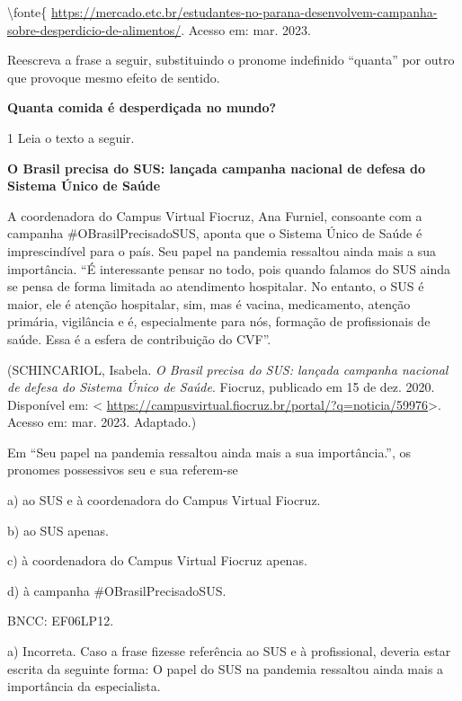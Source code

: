 {\textbackslash fonte\{
\url{https://mercado.etc.br/estudantes-no-parana-desenvolvem-campanha-sobre-desperdicio-de-alimentos/}.
Acesso em: mar. 2023.

Reescreva a frase a seguir, substituindo o pronome indefinido ``quanta''
por outro que provoque mesmo efeito de sentido.

\textbf{Quanta comida é desperdiçada no mundo?}




\num{1} Leia o texto a seguir.

\textbf{O Brasil precisa do SUS: lançada campanha nacional de defesa do
Sistema Único de Saúde}

A coordenadora do Campus Virtual Fiocruz, Ana Furniel, consoante com a
campanha \#OBrasilPrecisadoSUS, aponta que o Sistema Único de Saúde é
imprescindível para o país. Seu papel na pandemia ressaltou ainda mais a
sua importância. ``É interessante pensar no todo, pois quando falamos do
SUS ainda se pensa de forma limitada ao atendimento hospitalar. No
entanto, o SUS é maior, ele é atenção hospitalar, sim, mas é vacina,
medicamento, atenção primária, vigilância e é, especialmente para nós,
formação de profissionais de saúde. Essa é a esfera de contribuição do
CVF''.

(SCHINCARIOL, Isabela. \emph{O Brasil precisa do SUS: lançada campanha
nacional de defesa do Sistema Único de Saúde}. Fiocruz, publicado em 15
de dez. 2020. Disponível em: \textless{}
\url{https://campusvirtual.fiocruz.br/portal/?q=noticia/59976}\textgreater.
Acesso em: mar. 2023. Adaptado.)

Em ``Seu papel na pandemia ressaltou ainda mais a sua importância.'', os
pronomes possessivos seu e sua referem-se

a) ao SUS e à coordenadora do Campus Virtual Fiocruz.

b) ao SUS apenas.

c) à coordenadora do Campus Virtual Fiocruz apenas.

d) à campanha \#OBrasilPrecisadoSUS.

BNCC: EF06LP12.

a) Incorreta. Caso a frase fizesse referência ao SUS e à profissional,
deveria estar escrita da seguinte forma: O papel do SUS na pandemia
ressaltou ainda mais a importância da especialista.

}
